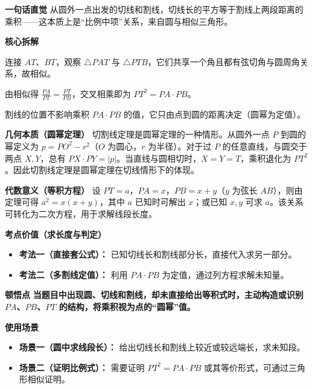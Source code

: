 \begin{explanationbox}
	\textbf{\textcolor{CExplanation}{一句话直觉}}
	从圆外一点出发的切线和割线，切线长的平方等于割线上两段距离的乘积——这本质上是“比例中项”关系，来自圆与相似三角形。

	\medskip
	\textbf{\textcolor{CExplanation}{核心拆解}}
	\begin{description}[style=nextline, leftmargin=2.8em, labelsep=0.5em, itemsep=0.45em]
		\item[\textbf{要点一（相似三角形）：}]
			连接 $AT$、$BT$，观察 $\triangle PAT$ 与 $\triangle PTB$，它们共享一个角且都有弦切角与圆周角关系，故相似。
		\item[\textbf{要点二（比例中项）：}]
			由相似得 $\frac{PA}{PT}=\frac{PT}{PB}$，交叉相乘即为 $PT^{2}=PA\cdot PB$。
		\item[\textbf{要点三（位置无关）：}]
			割线的位置不影响乘积 $PA\cdot PB$ 的值，它只由点到圆的距离决定（圆幂为定值）。
	\end{description}

	\medskip
	\textbf{\textcolor{CExplanation}{几何本质（圆幂定理）}}
	切割线定理是圆幂定理的一种情形。从圆外一点 $P$ 到圆的幂定义为 $p=PO^{2}-r^{2}$（$O$ 为圆心，$r$ 为半径）。对于过 $P$ 的任意直线，与圆交于两点 $X,Y$，总有 $PX\cdot PY=|p|$。当直线与圆相切时，$X=Y=T$，乘积退化为 $PT^{2}$。因此切割线定理是圆幂定理在切线情形下的体现。

	\medskip
	\textbf{\textcolor{CExplanation}{代数意义（等积方程）}}
	设 $PT=a$，$PA=x$，$PB=x+y$（$y$ 为弦长 $AB$），则由定理可得 $a^{2}=x(x+y)$，其中 $a$ 已知时可解出 $x$；或已知 $x,y$ 可求 $a$。该关系可转化为二次方程，用于求解线段长度。

	\medskip
	\textbf{\textcolor{CExplanation}{考点价值（求长度与判定）}}
	\begin{itemize}[leftmargin=*, itemsep=0.5em, topsep=0.4em]
		\item \textbf{考法一（直接套公式）：} 已知切线长和割线部分长，直接代入求另一部分。
		\item \textbf{考法二（多割线定值）：} 利用 $PA\cdot PB$ 为定值，通过列方程求解未知量。
	\end{itemize}

	\medskip
	\textbf{\textcolor{CExplanation}{顿悟点}}
	\textbf{当题目中出现圆、切线和割线，却未直接给出等积式时，主动构造或识别 $PA$、$PB$、$PT$ 的结构，将乘积视为点的“圆幂”值。}

	\medskip
	\textbf{\textcolor{CExplanation}{使用场景}}
	\begin{itemize}[leftmargin=*, itemsep=0.5em, topsep=0.4em]
		\item \textbf{场景一（圆中求线段长）：} 给出切线长和割线上较近或较远端长，求未知段。
		\item \textbf{场景二（证明比例式）：} 需要证明 $PT^{2}=PA\cdot PB$ 或其等价形式，可通过三角形相似证明。
	\end{itemize}

\end{explanationbox}
